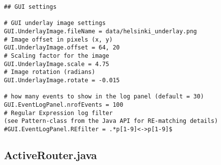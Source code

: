 \documentclass[11pt]{icsthesis}
\begin{document}
\begin{framed}
\begin{verbatim}
## GUI settings

# GUI underlay image settings
GUI.UnderlayImage.fileName = data/helsinki_underlay.png
# Image offset in pixels (x, y)
GUI.UnderlayImage.offset = 64, 20
# Scaling factor for the image
GUI.UnderlayImage.scale = 4.75
# Image rotation (radians)
GUI.UnderlayImage.rotate = -0.015

# how many events to show in the log panel (default = 30)
GUI.EventLogPanel.nrofEvents = 100
# Regular Expression log filter 
(see Pattern-class from the Java API for RE-matching details)
#GUI.EventLogPanel.REfilter = .*p[1-9]<->p[1-9]$
\end{verbatim}
\end{framed}

\subsection{ActiveRouter.java}
\end{document}
